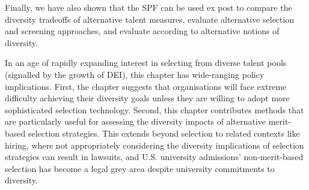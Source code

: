 Finally, we have also shown that the SPF can be used ex post to compare the diversity tradeoffs of alternative talent measures, evaluate alternative selection and screening approaches, and evaluate according to alternative notions of diversity. 

In an age of rapidly expanding interest in selecting from diverse talent pools (signalled by the growth of DEI), this chapter has wide-ranging policy implications. First, the chapter suggests that organisations will face extreme difficulty achieving their diversity goals unless they are willing to adopt more sophisticated selection technology. Second, this chapter contributes methods that are particularly useful for assessing the diversity impacts of alternative merit-based selection strategies. This extends beyond selection to related contexts like hiring, where not appropriately considering the diversity implications of selection strategies can result in lawsuits, and U.S. university admissions' non-merit-based selection has become a legal grey area despite university commitments to diversity. 